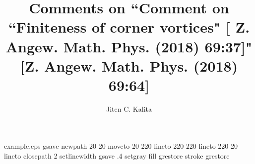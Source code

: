 %
%
%
%
%
\begin{filecontents*}{example.eps}
gsave
newpath
  20 20 moveto
  20 220 lineto
  220 220 lineto
  220 20 lineto
closepath
2 setlinewidth
gsave
  .4 setgray fill
grestore
stroke
grestore
\end{filecontents*}
%
\RequirePackage{fix-cm}
%
\documentclass[smallextended]{svjour3}       %
%
\smartqed  %
%
\usepackage{graphicx}
\usepackage{gensymb}
\usepackage{amsmath,amssymb}
\usepackage{epsfig,here}
\usepackage{mathptmx} 
\usepackage{epsfig}
%
%
%
%
%


\title{Comments on ``Comment on ``Finiteness of corner vortices" [ Z. Angew. Math. Phys. (2018) 69:37]"[Z. Angew. Math. Phys. (2018) 69:64]}


\author{Jiten C. Kalita}


